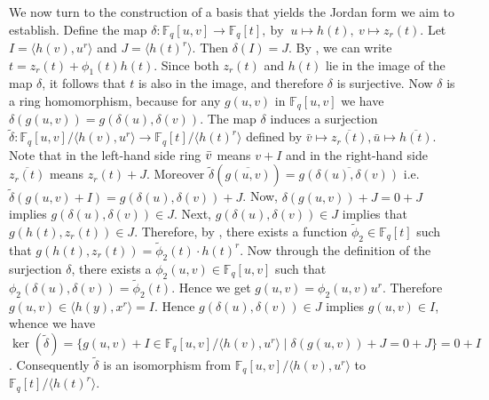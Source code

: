 \documentclass[11pt,twoside]{amsart}
\newtheorem{proposition}[lemma]{Proposition}
\theoremstyle{definition} %
\begin{document}
We now turn to the construction of a basis that yields the Jordan form we aim to establish.
Define the map $\delta: \mathbb{F}_q[u,v]\longrightarrow \mathbb{F}_q[t],~\text{by }~u\mapsto h(t), ~v\mapsto z_r(t)$. 
Let $I=\langle h(v),u^r\rangle$ and $J=\langle h(t)^r\rangle.$ Then $\delta(I)=J$. 
By , we can write $t = z_r(t) + \phi_1(t) h(t)$.
Since both $z_r(t)$ and $h(t)$ lie in the image of the map $\delta$, it follows that $t$ is also in the image, and therefore $\delta$ is surjective.
Now $\delta$ is a ring homomorphism, because for any $g(u,v)$ in $\mathbb{F}_q[u,v]$ we have $\delta(g(u,v))=g(\delta(u),\delta(v))$.
The map $\delta$ induces a surjection $\widetilde{\delta}:\mathbb{F}_q[u,v]/\langle h(v),u^r\rangle\longrightarrow \mathbb{F}_q[t]/\langle h(t)^r\rangle$ defined by $\bar{v}\mapsto \overline{z_r(t)},\bar{u}\mapsto \overline{h(t)}$.
Note that in the left-hand side ring $\Bar{v}$ means $v+I$ and in the right-hand side $\overline{z_r(t)}$ means $z_r(t)+J$.
Moreover $\widetilde{\delta}(\overline{g(u,v)})=\overline{g(\delta(u),\delta(v))}$ i.e. $\widetilde{\delta}(g(u,v)+I)=g(\delta(u),\delta(v))+J$.
Now, 
$\delta(g(u,v))+J=0+J$ implies $g(\delta(u),\delta(v))\in J$.
Next, $g(\delta(u),\delta(v))\in J$ implies that $g(h(t),z_r(t))\in J$. Therefore, by , there exists a function $\widetilde{\phi}_2\in \mathbb{F}_q[t]$ such that $g(h(t),z_r(t))=\widetilde{\phi}_2(t)\cdot h(t)^r$.
Now through the definition of the surjection $\delta$, there exists a $\phi_2(u,v)\in \mathbb{F}_q[u,v]$ such that $\phi_2(\delta(u),\delta(v))=\widetilde{\phi}_2(t)$. Hence we get $g(u,v)=\phi_2(u,v)u^r$. Therefore $g(u,v)\in \langle h(y),x^r\rangle=I$. Hence $g(\delta(u),\delta(v))\in J$ implies $g(u,v)\in I$, whence we have
$\ker (\widetilde{\delta})=\{g(u,v)+I\in \mathbb{F}_q[u,v]/\langle h(v),u^r\rangle \mid \delta(g(u,v))+J=0+J\}=0+I$.
Consequently $\widetilde{\delta}$ is an isomorphism from $\mathbb{F}_q[u,v]/\langle h(v),u^r\rangle$ to $ \mathbb{F}_q[t]/\langle h(t)^r\rangle$.
\end{document}
